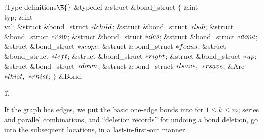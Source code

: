 \Y\B\4:Type definitions\X${}\E{}$\6
\&{typedef} \&{struct} \&{bond\_struct} ${}\{{}$\1\6
\&{int} \\{typ};\6
\&{int} \\{val};\6
\&{struct} \&{bond\_struct} ${}{*}\\{lchild}{}$;\6
\&{struct} \&{bond\_struct} ${}{*}\\{lsib}{}$;\6
\&{struct} \&{bond\_struct} ${}{*}\\{rsib}{}$;\6
\&{struct} \&{bond\_struct} ${}{*}\\{des}{}$;\6
\&{struct} \&{bond\_struct} ${}{*}\\{done}{}$;\6
\&{struct} \&{bond\_struct} ${}{*}\\{scope}{}$;\6
\&{struct} \&{bond\_struct} ${}{*}\\{focus}{}$;\6
\&{struct} \&{bond\_struct} ${}{*}\\{left}{}$;\6
\&{struct} \&{bond\_struct} ${}{*}\\{right}{}$;\6
\&{struct} \&{bond\_struct} ${}{*}\\{up}{}$;\6
\&{struct} \&{bond\_struct} ${}{*}\\{down}{}$;\6
\&{struct} \&{bond\_struct} ${}{*}\\{lsave},{}$ ${}{*}\\{rsave}{}$;\6
\&{Arc} ${}{*}\\{lhist},{}$ ${}{*}\\{rhist}{}$;\2\6
${}\}{}$ \&{Bond};\par
\U1.\fi

If the graph has  edges, we put the basic
one-edge bonds into
 for $1\le k\le m$; series and parallel combinations,
and ``deletion records'' for undoing a bond deletion, go into the
subsequent locations, in a last-in-first-out manner.

